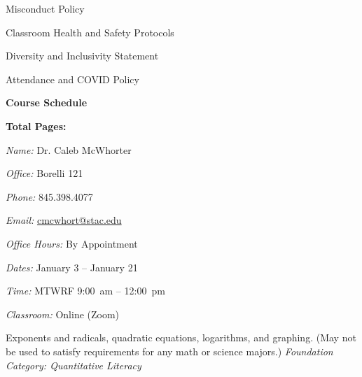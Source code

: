 \documentclass[11pt,letterpaper]{article}
\makeatletter
\newcommand{\classdates}{January 3 -- January 21}
\newcommand{\classtimes}{MTWRF 9:00~am -- 12:00~pm}
\newcommand{\classroom}{Online (Zoom)}
\newcommand{\instructor}{Dr. Caleb McWhorter}
\newcommand{\office}{Borelli 121}
\newcommand{\phone}{845.398.4077}
\newcommand{\email}{cmcwhort@stac.edu}
\newcommand{\officehours}{By Appointment}
\makeatother
\begin{document}
\begin{minipage}[t]{0.45\textwidth}
\hspace{0.6cm} Misconduct Policy \dotfill \pageref{college_sexmisconduct} \par
\hspace{0.3cm} Classroom Health and Safety Protocols \dotfill \pageref{college_healthsafety} \par
\hspace{0.3cm} Diversity and Inclusivity Statement \dotfill \pageref{college_inclusive} \par
\hspace{0.3cm} Attendance and COVID Policy \dotfill \pageref{college_attnd} \par
{\bfseries\color{stacred} Course Schedule} \dotfill \pageref{schd} \par
\hfill {\bfseries\color{stacred} Total Pages:} \pageref*{LastPage}
\end{minipage}
\sectionbreak









\textit{Name:} \instructor \par
\textit{Office:} \office \par
\textit{Phone:} \phone \par
\textit{Email:} \href{mailto:\email}{\email} \par
\textit{Office Hours:} \officehours 
\sectionbreak



\textit{Dates:} \classdates \par
\textit{Time:} \classtimes \par
\textit{Classroom:} \classroom 
\sectionbreak



Exponents and radicals, quadratic equations, logarithms, and graphing. (May not be used to satisfy requirements for any math or science majors.) {\itshape Foundation Category: Quantitative Literacy}
\sectionbreak
\end{document}
